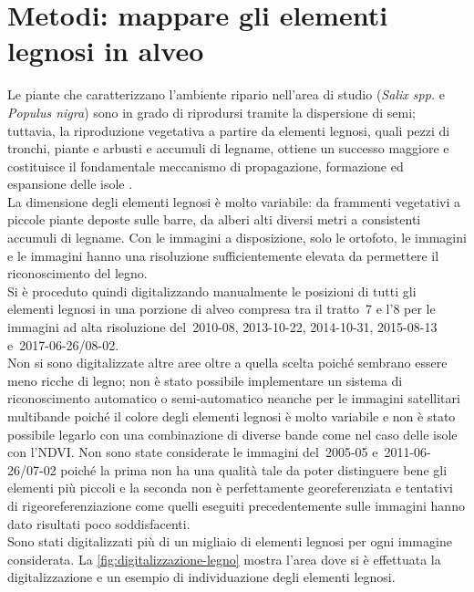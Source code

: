 \section{Metodi: mappare gli elementi legnosi in alveo}
Le piante che caratterizzano l'ambiente ripario nell'area di studio (\emph{Salix spp.} e \emph{Populus nigra}) sono in grado di riprodursi tramite la dispersione di semi;
tuttavia, la riproduzione vegetativa a partire da elementi legnosi, quali pezzi di tronchi, piante e arbusti e accumuli di legname, ottiene un successo maggiore e costituisce il fondamentale meccanismo di propagazione, formazione ed espansione delle isole .
\\
La dimensione degli elementi legnosi è molto variabile: da frammenti vegetativi a piccole piante deposte sulle barre, da alberi alti diversi metri a consistenti accumuli di legname.
Con le immagini a disposizione, solo le ortofoto, le immagini \Pl{} e le immagini \WV{} hanno una risoluzione sufficientemente elevata da permettere il riconoscimento del legno.
\\
Si è proceduto quindi digitalizzando manualmente le posizioni di tutti gli elementi legnosi in una porzione di alveo compresa tra il tratto~7 e l'8 per le immagini ad alta risoluzione del~2010-08, 2013-10-22, 2014-10-31, 2015-08-13 e~2017-06-26/08-02.
\\
Non si sono digitalizzate altre aree oltre a quella scelta poiché sembrano essere meno ricche di legno; non è stato possibile implementare un sistema di riconoscimento automatico o semi-automatico neanche per le immagini satellitari multibande poiché il colore degli elementi legnosi è molto variabile e non è stato possibile legarlo con una combinazione di diverse bande come nel caso delle isole con l'NDVI.
Non sono state considerate le immagini del~2005-05 e~2011-06-26/07-02 poiché la prima non ha una qualità tale da poter distinguere bene gli elementi più piccoli e la seconda non è perfettamente georeferenziata e tentativi di rigeoreferenziazione come quelli eseguiti precedentemente sulle immagini \AST{} hanno dato risultati poco soddisfacenti.
\\
Sono stati digitalizzati più di un migliaio di elementi legnosi per ogni immagine considerata.
La \cref{fig:digitalizzazione-legno} mostra l'area dove si è effettuata la digitalizzazione e un esempio di individuazione degli elementi legnosi.
%
